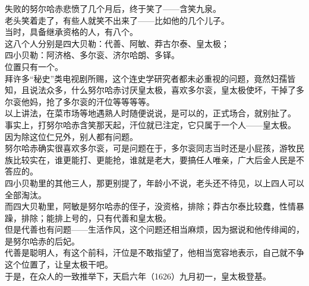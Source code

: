 	\begin{multicols}{\theparacolNo}
\fi
失败的努尔哈赤悲愤了几个月后，终于笑了——含笑九泉。\\

老头笑着走了，有些人就笑不出来了——比如他的几个儿子。\\

当时，具备继承资格的人，有八个。\\

这八个人分别是四大贝勒：代善、阿敏、莽古尔泰、皇太极；\\

四小贝勒：阿济格、多尔衮、济尔哈朗、多铎。\\

位置只有一个。\\

拜许多“秘史”类电视剧所赐，这个连史学研究者都未必重视的问题，竟然妇孺皆知，且说法众多，什么努尔哈赤讨厌皇太极，喜欢多尔衮，皇太极使坏，干掉了多尔衮他妈，抢了多尔衮的汗位等等等等。\\

以上讲法，在菜市场等地遇熟人时随便说说，是可以的，正式场合，就别扯了。\\

事实上，打努尔哈赤含笑那天起，汗位就已注定，它只属于一个人——皇太极。\\

因为除这位仁兄外，别人都有问题。\\

努尔哈赤确实很喜欢多尔衮，可是问题在于，多尔衮同志当时还是小屁孩，游牧民族比较实在，谁更能打、更能抢，谁就是老大，要搞任人唯亲，广大后金人民是不答应的。\\

四小贝勒里的其他三人，那更别提了，年龄小不说，老头还不待见，以上四人可以全部淘汰。\\

而四大贝勒里，阿敏是努尔哈赤的侄子，没资格，排除；莽古尔泰比较蠢，性情暴躁，排除；能排上号的，只有代善和皇太极。\\

但是代善也有问题——生活作风，这个问题还相当麻烦，因为据说和他传绯闻的，是努尔哈赤的后妃。\\

代善是聪明人，有这个前科，汗位是不敢指望了，他相当宽容地表示，自己就不争这个位置了，让皇太极干吧。\\

于是，在众人的一致推举下，天启六年（1626）九月初一，皇太极登基。\\


\end{multicols}
